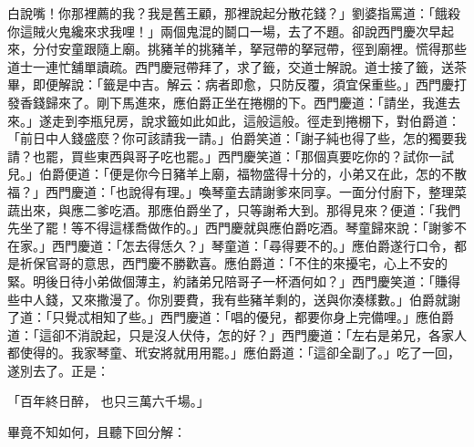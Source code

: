 白說嘴！你那裡薦的我？我是舊王顧，那裡說起分散花錢？」劉婆指罵道：「餓殺你這賊火鬼纔來求我哩！」兩個鬼混的鬬口一場，去了不題。卻說西門慶次早起來，分付安童跟隨上廟。挑豬羊的挑豬羊，拏冠帶的拏冠帶，徑到廟裡。慌得那些道士一連忙舖單讀疏。西門慶冠帶拜了，求了籤，交道士解說。道士接了籤，送茶畢，即便解說：「籤是中吉。解云：病者即愈，只防反覆，須宜保重些。」西門慶打發香錢歸來了。剛下馬進來，應伯爵正坐在捲棚的下。西門慶道：「請坐，我進去來。」遂走到李瓶兒房，說求籤如此如此，這般這般。徑走到捲棚下，對伯爵道：「前日中人錢盛麼？你可該請我一請。」伯爵笑道：「謝子純也得了些，怎的獨要我請？也罷，買些東西與哥子吃也罷。」西門慶笑道：「那個真要吃你的？試你一試兒。」伯爵便道：「便是你今日豬羊上廟，福物盛得十分的，小弟又在此，怎的不散福？」西門慶道：「也說得有理。」喚琴童去請謝爹來同享。一面分付廚下，整理菜蔬出來，與應二爹吃酒。那應伯爵坐了，只等謝希大到。那得見來？便道：「我們先坐了罷！等不得這樣喬做作的。」西門慶就與應伯爵吃酒。琴童歸來說：「謝爹不在家。」西門慶道：「怎去得恁久？」琴童道：「尋得要不的。」應伯爵遂行口令，都是祈保官哥的意思，西門慶不勝歡喜。應伯爵道：「不住的來擾宅，心上不安的緊。明後日待小弟做個薄主，約諸弟兄陪哥子一杯酒何如？」西門慶笑道：「賺得些中人錢，又來撒漫了。你別要費，我有些豬羊剩的，送與你湊樣數。」伯爵就謝了道：「只覺忒相知了些。」西門慶道：「唱的優兒，都要你身上完備哩。」應伯爵道：「這卻不消說起，只是沒人伏侍，怎的好？」西門慶道：「左右是弟兄，各家人都使得的。我家琴童、玳安將就用用罷。」應伯爵道：「這卻全副了。」吃了一回，遂別去了。正是：

「百年終日醉，  也只三萬六千場。」

畢竟不知如何，且聽下回分解：
